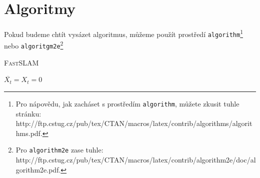 \documentclass[a4paper, 11pt]{article}
\begin{document}
    \section{Algoritmy}
    \label{section:algoritmy}
    Pokud budeme chtít vysázet algoritmus, můžeme použít prostředí \verb|algorithm|\footnote{Pro nápovědu, jak zacháset s prostředím \texttt{algorithm}, můžete zkusit tuhle stránku:\\ http://ftp.cstug.cz/pub/tex/CTAN/macros/latex/contrib/algorithms/algorithms.pdf.} nebo \verb|algoritgm2e|\footnote{Pro \texttt{algorithm2e} zase tuhle: http://ftp.cstug.cz/pub/tex/CTAN/macros/latex/contrib/algorithm2e/doc/algorithm2e.pdf.}
    \IncMargin{1.5em}
	\begin{algorithm}
		\caption{\textsc{FastSLAM}}
		\label{algorithm:fastslam}
		\SetNlSty{}{}{:}
		\SetNlSkip{0.4em}
		\SetInd{1em}{1em}
		\Indm\Indmm
		\Indp\Indpp
		\BlankLine
		$\overline{X_t}=X_t=0$ \\
	\end{algorithm}
\end{document}
